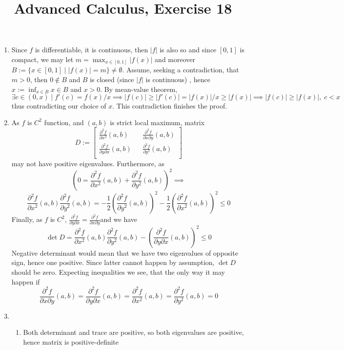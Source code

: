 \documentclass[8pt]{article} %
\title{Advanced Calculus, Exercise 18}
\begin{document}
\maketitle
\begin{enumerate}
\item{
Since $f$ is differentiable, it is continuous, then $|f|$ is also so and since $[0,1]$ is compact, we may let $\displaystyle m=\max_{x\in[0,1]}|f(x)|$ and
moreover $B:=\{x\in[0,1]\mid |f(x)|=m\}\neq \emptyset$. Assume, seeking a contradiction, that $m>0$, then $0\notin B$ and $B$ is closed (since $|f|$ is continuous)
, hence $\displaystyle x:=\inf_{x\in B} x\in B$ and $x>0$. By mean-value theorem, 
\[\exists c\in (0,x) \mid f'(c)=f(x)/x\implies |f(c)|\geq|f'(c)|=|f(x)|/x\geq |f(x)|\implies |f(c)|\geq |f(x)|,\;c<x\]
thus contradicting our choice of $x$. This contradiction finishes the proof.
}
\item{
As $f$ is $C^2$ function, and $(a,b)$ is strict local maximum, matrix
\[D:=\begin{bmatrix}
\frac{\partial^2 f}{\partial x^2}(a,b) && \frac{\partial^2 f}{\partial x\partial y}(a,b)\\
\frac{\partial^2 f}{\partial y \partial x}(a,b) && \frac{\partial^2 f}{\partial y^2}(a,b) \\
\end{bmatrix}\]
may not have positive eigenvalues. Furthermore, as
\[\left(0=\frac{\partial^2 f}{\partial x^2}(a,b)+\frac{\partial^2 f}{\partial y^2}(a,b)\right)^2\implies\]
\[\frac{\partial^2 f}{\partial x^2}(a,b)\frac{\partial^2 f}{\partial y^2}(a,b)=
-\frac{1}{2}\left(\frac{\partial^2 f}{\partial y^2}(a,b)\right)^2-\frac{1}{2}\left(\frac{\partial^2 f}{\partial x^2}(a,b)\right)^2\leq 0
\]
Finally, as $f$ is $C^2$, $\frac{\partial^2 f}{\partial y \partial x}=\frac{\partial^2 f}{\partial x \partial y}$and we have
\[\det D=\frac{\partial^2 f}{\partial x^2}(a,b)\frac{\partial^2 f}{\partial y^2}(a,b)-\left(\frac{\partial^2 f}{\partial y \partial x}(a,b)\right)^2\leq 0\]
Negative determinant would mean that we have two eigenvalues of opposite sign, hence one positive. Since latter cannot happen by assumption, $\det D$ should be zero.
Expecting inequalities we see, that the only way it may happen if
\[\frac{\partial^2 f}{\partial x \partial y}(a,b)=\frac{\partial^2 f}{\partial y \partial x}(a,b)=\frac{\partial^2 f}{\partial x^2}(a,b)=\frac{\partial^2 f}{\partial y^2}(a,b)=0\]
}
\item{
\begin{enumerate}[label=(\alph*)]
\item{Both determinant and trace are positive, so both eigenvalues are positive, hence matrix is positive-definite}

\end{enumerate}}
\end{enumerate}
\end{document}
